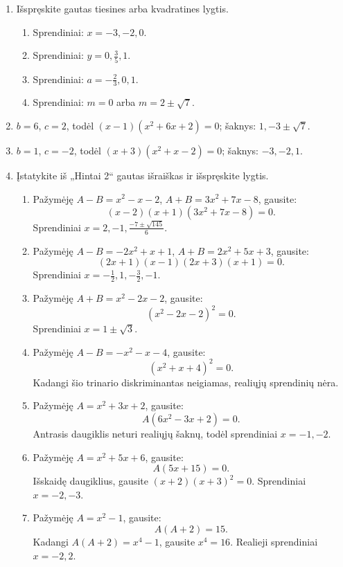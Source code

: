 \documentclass[11pt,a4paper]{scrartcl}
\begin{document}
\begin{enumerate}[label=\textbf{\arabic*.}, leftmargin=*]
    \item Išspręskite gautas tiesines arba kvadratines lygtis.
    \begin{enumerate}[label={(\arabic*)}]
        \item Sprendiniai: $x=-3,-2,0$.
        \item Sprendiniai: $y=0,\frac35,1$.
        \item Sprendiniai: $a=-\frac23,0,1$.
        \item Sprendiniai: $m=0$ arba $m=2\pm\sqrt7$.
        \end{enumerate}
        \item $b=6$, $c=2$, todėl $(x-1)(x^2+6x+2)=0$; šaknys: $1,-3\pm\sqrt7$.
        \item $b=1$, $c=-2$, todėl $(x+3)(x^2+x-2)=0$; šaknys: $-3,-2,1$.

    \item Įstatykite iš „Hintai 2“ gautas išraiškas ir išspręskite lygtis.
    \begin{enumerate}[label={(\arabic*)}]
        \item Pažymėję $A-B=x^2-x-2$, $A+B=3x^2+7x-8$, gausite: $$(x-2)(x+1)(3x^2+7x-8)=0.$$ 
        Sprendiniai $x=2,-1,\frac{-7\pm\sqrt{145}}6$.
        \item Pažymėję $A-B=-2x^2+x+1$, $A+B=2x^2+5x+3$, gausite:
        $$(2x+1)(x-1)(2x+3)(x+1)=0.$$
        Sprendiniai $x=-\frac12,1,-\frac32,-1$.

        \item Pažymėję $A+B=x^2-2x-2$, gausite:
        $$(x^2-2x-2)^2=0.$$
        Sprendiniai $x=1\pm\sqrt3$.

        \item Pažymėję $A-B=-x^2-x-4$, gausite:
        $$(x^2+x+4)^2=0.$$
        Kadangi šio trinario diskriminantas neigiamas, realiųjų sprendinių nėra.

        \item Pažymėję $A=x^2+3x+2$, gausite:
        $$A(6x^2-3x+2)=0.$$
        Antrasis daugiklis neturi realiųjų šaknų, todėl sprendiniai $x=-1,-2$.

        \item Pažymėję $A=x^2+5x+6$, gausite:
        $$A(5x+15)=0.$$
        Išskaidę daugiklius, gausite $(x+2)(x+3)^2=0$. Sprendiniai $x=-2,-3$.

        \item Pažymėję $A=x^2-1$, gausite:
        $$A(A+2)=15.$$
        Kadangi $A(A+2)=x^4-1$, gausite $x^4=16$. Realieji sprendiniai $x=-2,2$.
    \end{enumerate}
\end{enumerate}
\end{document}

